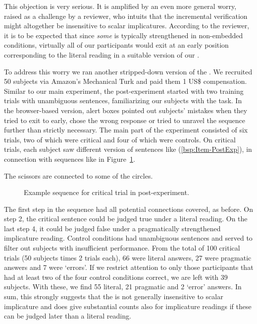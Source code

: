 \documentclass[fleqn,reqno,10pt]{article}
\newcommand{\lit}{\acro{lit}}
\newcommand{\ivt}{\acro{ivt}}
\begin{document}
This objection is very serious. It is amplified by an even more
general worry, raised as a challenge by a reviewer, who intuits that
the incremental verification might altogether be insensitive to scalar
implicatures. According to the reviewer, it is to be expected that
since \emph{some} is typically strengthened in non-embedded
conditions, virtually all of our participants would exit at an early
position corresponding to the literal reading in a suitable version of
our \ivt. 

To address this worry we ran another stripped-down version of the
\ivt. We recruited 50 subjects via Amazon's Mechanical Turk and paid
them 1 US\$ compensation. Similar to our main experiment, the
post-experiment started with two training trials with unambiguous
sentences, familiarizing our subjects with the task. In the
browser-based version, alert boxes pointed out subjects' mistakes when
they tried to exit to early, chose the wrong response or tried to
unravel the sequence further than strictly necessary. The main part of
the experiment consisted of six trials, two of which were critical and
four of which were controls. On critical trials, each subject saw
different version of sentences like (\ref{bsp:Item-PostExp}), in
connection with sequences like in Figure~\ref{fig:Trial-PostExp}.

\begin{exe}
  \ex \label{bsp:Item-PostExp} The scissors are connected to some of the circles.
\end{exe}

\begin{figure}[t]
	\centering
	\subfloat[][Step 2  (\lit true)]{ 
		\fbox{\texttt{[image: pictures/PostExp\_2.pdf]}}
	    \label{fig:exseqES1}
	}
	\caption{Example sequence for critical trial in
          post-experiment.}
	\label{fig:Trial-PostExp}
\end{figure}

\noindent The first step in the sequence had all potential connections
covered, as before. On step 2, the critical sentence could be judged
true under a literal reading. On the last step 4, it could be judged
false under a pragmatically strengthened implicature reading. Control
conditions had unambiguous sentences and served to filter out subjects
with insufficient performance. From the total of 100 critical trials
(50 subjects times 2 trials each), 66 were literal answers, 27 were
pragmatic answers and 7 were `errors'. If we restrict attention to
only those participants that had at least two of the four control
conditions correct, we are left with 39 subjects. With these, we find
55 literal, 21 pragmatic and 2 `error' answers. In sum, this strongly
suggests that the \ivt is not generally insensitive to scalar
implicature and does give substantial counts also for implicature
readings if these can be judged later than a literal reading. 
\end{document}
